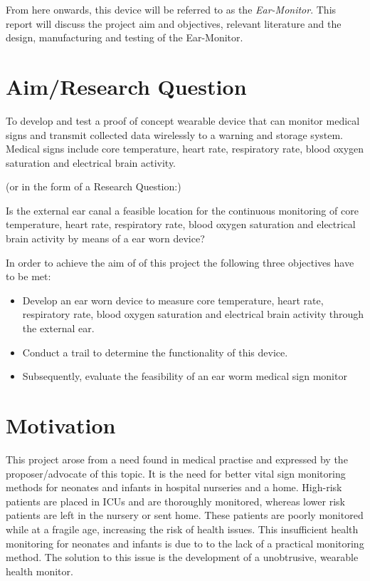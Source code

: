 \medskip
From here onwards, this device will be referred to as the \textit{Ear-Monitor}. This report will discuss the project aim and objectives, relevant literature and the design, manufacturing and testing of the Ear-Monitor.

\section{Aim/Research Question}
To develop and test a proof of concept wearable device that can monitor medical signs and transmit collected data wirelessly to a warning and storage system. Medical signs include core temperature, heart rate, respiratory rate, blood oxygen saturation and electrical brain activity.

\begin{center}(or in the form of a Research Question:)\end{center}

Is the external ear canal a feasible location for the continuous monitoring of core temperature, heart rate, respiratory rate, blood oxygen saturation and electrical brain activity by means of a ear worn device?

\medskip

In order to achieve the aim of of this project the following three objectives have to be met:
\begin{itemize}
\item Develop an ear worn device to measure core temperature, heart rate, respiratory rate, blood oxygen saturation and electrical brain activity through the external ear.
\item Conduct a trail to determine the functionality of this device.
\item Subsequently, evaluate the feasibility of an ear worm medical sign monitor
\end{itemize}

\section{Motivation}
This project arose from a need found in medical practise and expressed by the proposer/advocate of this topic. It is the need for better vital sign monitoring methods for neonates and infants in hospital nurseries and a home. High-risk patients are placed in ICUs and are thoroughly monitored, whereas lower risk patients are left in the nursery or sent home. These patients are poorly monitored while at a fragile age, increasing the risk of health issues. This insufficient health monitoring for neonates and infants is due to to the lack of a practical monitoring method. The solution to this issue is the development of a unobtrusive, wearable health monitor.

